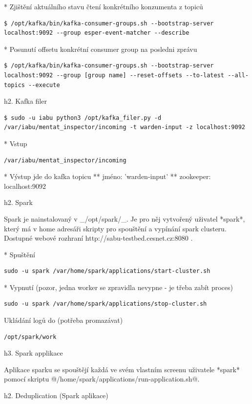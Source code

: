 \documentclass[a4paper]{article} %
\begin{document}
* Zjištění aktuálního stavu čtení konkrétního konzumenta z topiců
\begin{lstlisting}[]
$ /opt/kafka/bin/kafka-consumer-groups.sh --bootstrap-server localhost:9092 --group esper-event-matcher --describe
\end{lstlisting}

* Posunutí offsetu konkrétní consumer group na posledni zprávu
\begin{lstlisting}[]
$ /opt/kafka/bin/kafka-consumer-groups.sh --bootstrap-server localhost:9092 --group [group name] --reset-offsets --to-latest --all-topics --execute
\end{lstlisting}

h2. Kafka filer

\begin{lstlisting}[]
$ sudo -u iabu python3 /opt/kafka_filer.py -d /var/iabu/mentat_inspector/incoming -t warden-input -z localhost:9092
\end{lstlisting}

* Vstup \begin{lstlisting}[]/var/iabu/mentat_inspector/incoming\end{lstlisting}
* Výstup jde do kafka topicu
** jméno: 'warden-input'
** zookeeper: localhost:9092

h2. Spark

Spark je nainstalovaný v _/opt/spark/_. Je pro něj vytvořený uživatel *spark*, který má v home adresáři skripty pro spouštění a vypínání spark clusteru. 
Dostupné webové rozhraní http://sabu-testbed.cesnet.cz:8080 .

* Spuštění
\begin{lstlisting}[]
sudo -u spark /var/home/spark/applications/start-cluster.sh
\end{lstlisting}
* Vypnutí  (pozor, jedna worker se zpravidla nevypne - je třeba zabít proces)
\begin{lstlisting}[]
sudo -u spark /var/home/spark/applications/stop-cluster.sh
\end{lstlisting}

Ukládání logů do  (potřeba promazávat)
\begin{lstlisting}[]
/opt/spark/work
\end{lstlisting}

h3. Spark applikace

Aplikace sparku se spouštějí každá ve svém vlastním screenu uživatele *spark* pomocí skriptu @/home/spark/applications/run-application.sh@.

h2. Deduplication (Spark aplikace)
\end{document}
